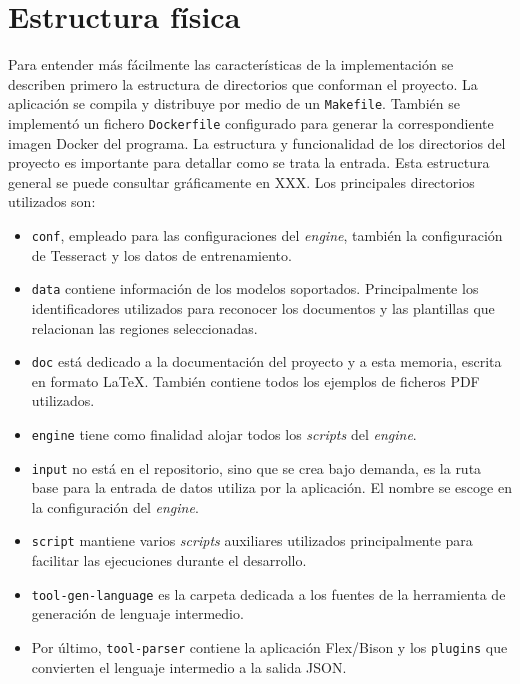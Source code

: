 

\section{Estructura física}

Para entender más fácilmente las características de la implementación se describen primero la estructura de directorios que conforman el proyecto. La aplicación se compila y distribuye por medio de un \verb|Makefile|. También se implementó un fichero \verb|Dockerfile|  configurado para generar la correspondiente imagen Docker del programa. 
La estructura y funcionalidad de los directorios del proyecto es importante para detallar como se trata la entrada. Esta estructura general se puede consultar gráficamente en XXX. Los principales directorios utilizados son:

\begin{itemize}
    \item \verb|conf|, empleado para las configuraciones del \emph{engine}, también la configuración de Tesseract y los datos de entrenamiento.
    \item \verb|data| contiene información de los modelos soportados. Principalmente los identificadores utilizados para reconocer los documentos y las plantillas que relacionan las regiones seleccionadas.
    \item \verb|doc| está dedicado a la documentación del proyecto y a esta memoria, escrita en formato \LaTeX. También contiene todos los ejemplos de ficheros PDF utilizados.
    \item \verb|engine| tiene como finalidad alojar todos los \emph{scripts} del \emph{engine}.
    \item \verb|input| no está en el repositorio, sino que se crea bajo demanda, es la ruta base para la entrada de datos utiliza por la aplicación. El nombre se escoge en la configuración del \emph{engine}.
    \item \verb|script| mantiene varios \emph{scripts} auxiliares utilizados principalmente para facilitar las ejecuciones durante el desarrollo.
    \item \verb|tool-gen-language| es la carpeta dedicada a los fuentes de la herramienta de generación de lenguaje intermedio.
    \item Por último, \verb|tool-parser| contiene la aplicación Flex/Bison y los \verb|plugins| que convierten el lenguaje intermedio a la salida JSON.
\end{itemize}

